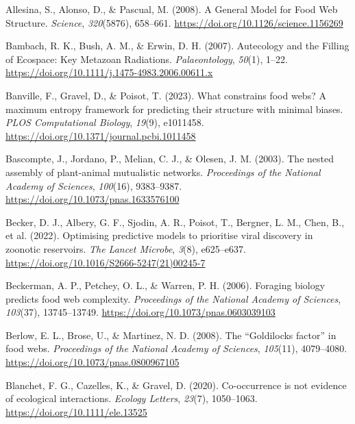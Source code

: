 \documentclass[
]{agujournal2019}
\newlength{\cslhangindent}
\newenvironment{CSLReferences}[2] %
 {\begin{list}{}{%
  \setlength{\itemindent}{0pt}
  \setlength{\leftmargin}{0pt}
  \setlength{\parsep}{0pt}
  \ifodd #1
   \setlength{\leftmargin}{\cslhangindent}
   \setlength{\itemindent}{-1\cslhangindent}
  \fi
  \setlength{\itemsep}{#2\baselineskip}}}
 {\end{list}}
\begin{document}
\label{refs}
\begin{CSLReferences}{1}{0}
Allesina, S., Alonso, D., \& Pascual, M. (2008). A {General Model} for
{Food Web Structure}. \emph{Science}, \emph{320}(5876), 658--661.
\url{https://doi.org/10.1126/science.1156269}

Bambach, R. K., Bush, A. M., \& Erwin, D. H. (2007). Autecology and the
{Filling} of {Ecospace}: {Key Metazoan Radiations}.
\emph{Palaeontology}, \emph{50}(1), 1--22.
\url{https://doi.org/10.1111/j.1475-4983.2006.00611.x}

Banville, F., Gravel, D., \& Poisot, T. (2023). What constrains food
webs? {A} maximum entropy framework for predicting their structure with
minimal biases. \emph{PLOS Computational Biology}, \emph{19}(9),
e1011458. \url{https://doi.org/10.1371/journal.pcbi.1011458}

Bascompte, J., Jordano, P., Melian, C. J., \& Olesen, J. M. (2003). The
nested assembly of plant-animal mutualistic networks. \emph{Proceedings
of the National Academy of Sciences}, \emph{100}(16), 9383--9387.
\url{https://doi.org/10.1073/pnas.1633576100}

Becker, D. J., Albery, G. F., Sjodin, A. R., Poisot, T., Bergner, L. M.,
Chen, B., et al. (2022). Optimising predictive models to prioritise
viral discovery in zoonotic reservoirs. \emph{The Lancet Microbe},
\emph{3}(8), e625--e637.
\url{https://doi.org/10.1016/S2666-5247(21)00245-7}

Beckerman, A. P., Petchey, O. L., \& Warren, P. H. (2006). Foraging
biology predicts food web complexity. \emph{Proceedings of the National
Academy of Sciences}, \emph{103}(37), 13745--13749.
\url{https://doi.org/10.1073/pnas.0603039103}

Berlow, E. L., Brose, U., \& Martinez, N. D. (2008). The {``{Goldilocks}
factor''} in food webs. \emph{Proceedings of the National Academy of
Sciences}, \emph{105}(11), 4079--4080.
\url{https://doi.org/10.1073/pnas.0800967105}

Blanchet, F. G., Cazelles, K., \& Gravel, D. (2020). Co-occurrence is
not evidence of ecological interactions. \emph{Ecology Letters},
\emph{23}(7), 1050--1063. \url{https://doi.org/10.1111/ele.13525}


\end{CSLReferences}
\end{document}
